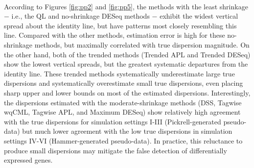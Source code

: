 \documentclass[10pt]{article}
\begin{document}
\paragraph{} \indent According to Figures \ref{fig:pp2} and \ref{fig:pp5}, the methods with the least shrinkage $-$ i.e., the QL and no-shrinkage DESeq methods $-$ exhibit the widest vertical spread about the identity line, but have patterns most closely resembling this line. Compared with the other methods, estimation error is high for these no-shrinkage methods, but maximally correlated with true dispersion magnitude. On the other hand, both of the trended methods (Trended APL and Trended DESeq) show the lowest vertical spreads, but the greatest systematic departures from the identity line. These trended methods systematically underestimate large true dispersions and systematically overestimate small true dispersions, even placing sharp upper and lower bounds on most of the estimated dispersions. %
 Interestingly, the dispersions estimated with the moderate-shrinkage methods (DSS, Tagwise wqCML, Tagwise APL, and Maximum DESeq) show relatively high agreement with the true dispersions for simulation settings I-III (Pickrell-generated pseudo-data) but much lower agreement with the low true dispersions in simulation settings IV-VI (Hammer-generated pseudo-data). In practice, this reluctance to produce small dispersions may mitigate the false detection of differentially expressed genes.
\end{document}
